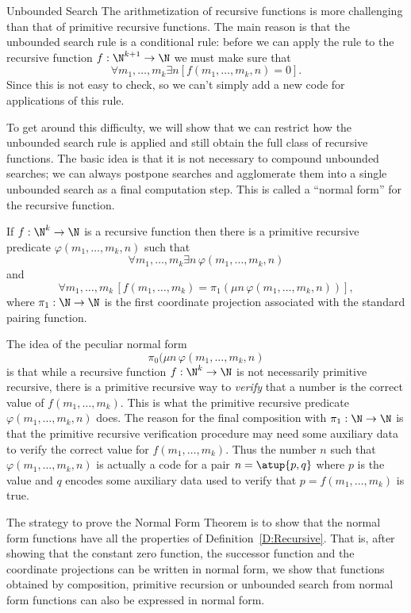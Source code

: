 \begin{unit}{Unbounded Search}
The arithmetization of recursive functions is more challenging than that of primitive recursive functions.
The main reason is that the unbounded search rule is a conditional rule: before we can apply the rule to the recursive function \(f:\N^{k+1}\to\N\) we must make sure that \[\forall m_1,\dots,m_k \exists n [f(m_1,\dots,m_k,n) = 0].\]
Since this is not easy to check, so we can't simply add a new code for applications of this rule.

To get around this difficulty, we will show that we can restrict how the unbounded search rule is applied and still obtain the full class of recursive functions.
The basic idea is that it is not necessary to compound unbounded searches; we can always postpone searches and agglomerate them into a single unbounded search as a final computation step.
This is called a ``normal form'' for the recursive function.

\begin{theorem}\label{T:NormalForm}
  If \(f:\N^k\to\N\) is a recursive function then there is a primitive recursive predicate \(\varphi(m_1,\dots,m_k,n)\) such that \[\forall m_1,\dots,m_k \exists n\,\varphi(m_1,\dots,m_k,n)\] and \[\forall m_1,\dots,m_k\,[f(m_1,\dots,m_k) = \pi_1(\mu n\,\varphi(m_1,\dots,m_k,n))],\] where \(\pi_1:\N\to\N\) is the first coordinate projection associated with the standard pairing function.
\end{theorem}

\noindent
The idea of the peculiar normal form \[\pi_0(\mu n\,\varphi(m_1,\dots,m_k,n)\] is that while a recursive function \(f:\N^k\to\N\) is not necessarily primitive recursive, there is a primitive recursive way to \textit{verify} that a number is the correct value of \(f(m_1,\dots,m_k).\)
This is what the primitive recursive predicate \(\varphi(m_1,\dots,m_k,n)\) does.
The reason for the final composition with \(\pi_1:\N\to\N\) is that the primitive recursive verification procedure may need some auxiliary data to verify the correct value for \(f(m_1,\dots,m_k).\)
Thus the number \(n\) such that \(\varphi(m_1,\dots,m_k,n)\) is actually a code for a pair \(n = \atup{p,q}\) where \(p\) is the value and \(q\) encodes some auxiliary data used to verify that \(p = f(m_1,\dots,m_k)\) is true.

The strategy to prove the Normal Form Theorem is to show that the normal form functions have all the properties of Definition~\ref{D:Recursive}.
That is, after showing that the constant zero function, the successor function and the coordinate projections can be written in normal form, we show that functions obtained by composition, primitive recursion or unbounded search from normal form functions can also be expressed in normal form.


\end{unit}
